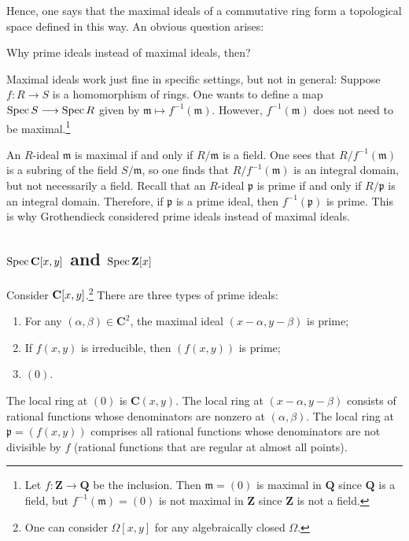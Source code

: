 \documentclass [11 pt, oneside, margin = 1 in] {article}
\begin{document}
Hence, one says that the maximal ideals of a commutative ring form a topological space defined in this way. An obvious question arises:
\begin{center}
	\small Why prime ideals instead of maximal ideals, then?
\end{center}
Maximal ideals work just fine in specific settings, but not in general: Suppose $f:R\longrightarrow S$ is a homomorphism of rings. One wants to define a map $\operatorname{Spec} S \longrightarrow \operatorname{Spec} R$ given by $\mathfrak{m} \longmapsto f^{-1}(\mathfrak{m})$. However, $f^{-1}(\mathfrak{m})$ does not need to be maximal.\footnote{Let $f:\mathbf{Z} \longrightarrow \mathbf{Q}$ be the inclusion. Then $\mathfrak{m}=(0)$ is maximal in $\mathbf{Q}$ since $\mathbf{Q}$ is a field, but $f^{-1}(\mathfrak{m}) = (0)$ is not maximal in $\mathbf{Z}$ since $\mathbf{Z}$ is not a field.}

An $R$-ideal $\mathfrak{m}$ is maximal if and only if $R/\mathfrak{m}$ is a field. One sees that $R/f^{-1}(\mathfrak{m})$ is a subring of the field $S/\mathfrak{m}$, so one finds that $R/f^{-1}(\mathfrak{m})$ is an integral domain, but not necessarily a field. Recall that an $R$-ideal $\mathfrak{p}$ is prime if and only if $R/\mathfrak{p}$ is an integral domain. Therefore, if $\mathfrak{p}$ is a prime ideal, then $f^{-1}(\mathfrak{p})$ is prime. This is why Grothendieck considered prime ideals instead of maximal ideals.

\subsection{$\operatorname{Spec} \mathbf C[x,y]$ and $\operatorname{Spec} \mathbf Z[x]$}
Consider $\mathbf C[x,y]$.\footnote{One can consider $\Omega[x,y]$ for any algebraically closed $\Omega$.} There are three types of prime ideals:
\begin{enumerate}
	\item For any $(\alpha,\beta)\in  \mathbf{C}^2$, the maximal ideal $(x-\alpha,y-\beta)$ is prime;
	\item If $f(x,y)$ is irreducible, then $(f(x,y))$ is prime; 
	\item $(0)$.
\end{enumerate}
The local ring at $(0)$ is $\mathbf{C}(x,y)$. The local ring at $(x-\alpha, y-\beta)$ consists of rational functions whose denominators are nonzero at $(\alpha,\beta)$. The local ring at $\mathfrak{p} = (f(x,y))$ comprises all rational functions whose denominators are not divisible by $f$ (rational functions that are regular at almost all points).
\end{document}
